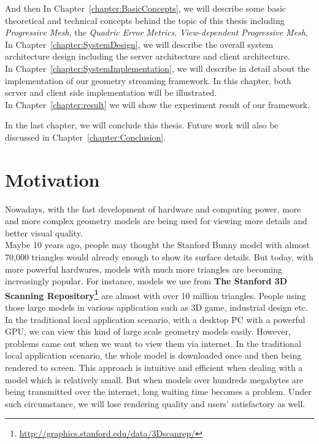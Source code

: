 And then In Chapter~\ref{chapter:BasicConcepts}, we will describe some basic theoretical and technical concepts behind the topic of this thesis including \emph{Progressive Mesh}, the \emph{Quadric Error Metrics}, \emph{View-dependent Progressive Mesh}, \etc \\

In Chapter~\ref{chapter:SystemDesign}, we will describe the overall system architecture design including the server architecture and client architecture. \\

In Chapter~\ref{chapter:SystemImplementation}, we will describe in detail about the implementation of our geometry streaming framework. In this chapter, both server and client side implementation will be illustrated.\\

In Chapter~\ref{chapter:result} we will show the experiment result of our framework. 

In the last chapter, we will conclude this thesis. Future work will also be discussed in Chapter~\ref{chapter:Conclusion}. 

\section{Motivation}
\label{section:motivation}

Nowadays, with the fast development of hardware and computing power, more and more complex geometry models are being used for viewing more details and better visual quality. \\

Maybe 10 years ago, people may thought the Stanford Bunny model with almost 70,000 triangles would already enough to show its surface details. But today, with more powerful hardwares, models with much more triangles are becoming increasingly popular. For instance, models we use from \textbf{The Stanford 3D Scanning Repository\footnote{\label{S3DSR}\url{http://graphics.stanford.edu/data/3Dscanrep/}}} are almost with over 10 million triangles. People using those large models in various application such as 3D game, industrial design etc.\\

In the traditional local application scenario, with a desktop PC with a powerful GPU, we can view this kind of large scale geometry models easily. However, problems came out when we want to view them via internet. In the traditional local application scenario, the whole model is downloaded once and then being rendered to screen. This approach is intuitive and efficient when dealing with a model which is relatively small. But when models over hundreds megabytes are being transmitted over the internet, long waiting time becomes a problem. Under such circumstance, we will lose rendering quality and users' satisfactory as well. \\

